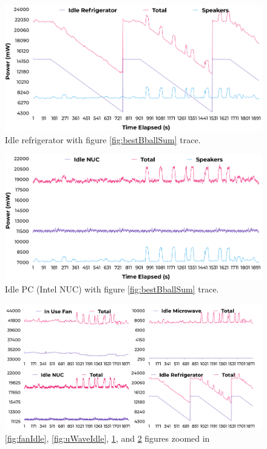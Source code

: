 \begin{figure}[H]
  \centering
  \includegraphics[width=1\textwidth]{figures/idleFridgeNoise.png}
  \caption{Idle refrigerator with figure \ref{fig:bestBballSum} trace.}
  \label{fig:fridgeIdle}
\end{figure}

\begin{figure}[H]
  \centering
  \includegraphics[width=1\textwidth]{figures/idleIntelNUCNoise.png}
  \caption{Idle PC (Intel NUC) with figure \ref{fig:bestBballSum} trace.}
  \label{fig:nucIdle}
\end{figure}

\begin{figure}[H]
    \centering
    \includegraphics[width=1\textwidth]{figures/allIdleNoise.png}
    \caption{\ref{fig:fanIdle}, \ref{fig:uWaveIdle}, \ref{fig:fridgeIdle}, and \ref{fig:nucIdle} figures zoomed in}
    \label{fig:allIdleNoise}
  \end{figure}

